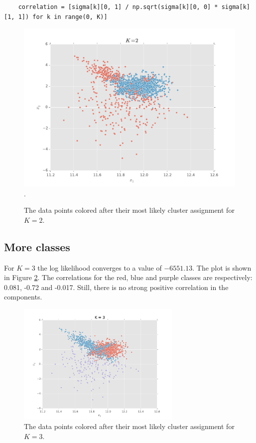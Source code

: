 \documentclass[paper=a4, fontsize=10pt]{scrartcl} %
\numberwithin{equation}{section} %
\numberwithin{figure}{section} %
\numberwithin{table}{section} %
\begin{document}
\begin{verbatim}
	correlation = [sigma[k][0, 1] / np.sqrt(sigma[k][0, 0] * sigma[k][1, 1]) for k in range(0, K)]
\end{verbatim}

\begin{figure}[h!]
	\centering
	\includegraphics[width=\textwidth]{exercise_13.pdf}.
	\caption{The data points colored after their most likely cluster assignment for $K = 2$.}
	\label{k2}
\end{figure}

\subsection{More classes}
For $K=3$ the log likelihood converges to a value of $-6551.13$. The plot is shown in Figure \ref{k3}. The correlations for the red, blue and purple classes are respectively: 0.081, -0.72 and -0.017. Still, there is no strong positive correlation in the components.

\begin{figure}[H]
	\centering
	\includegraphics[width=0.7\textwidth]{exercise_14a.pdf}
	\caption{The data points colored after their most likely cluster assignment for $K = 3$.}
	\label{k3}
\end{figure}
\end{document}
